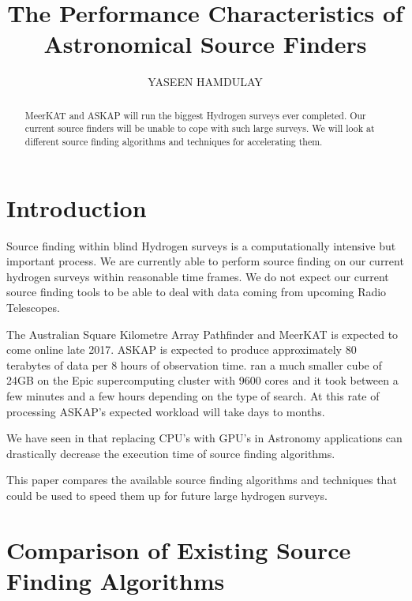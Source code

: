 \documentclass[prodmode,acmtecs]{acmsmall} \usepackage[ruled]{algorithm2e}
\begin{document}
\title{The Performance Characteristics of Astronomical Source Finders}
\author{YASEEN HAMDULAY
}

\begin{abstract}
MeerKAT and ASKAP will run the biggest Hydrogen surveys ever completed. Our current source
finders will be unable to cope with such large surveys. We will look at different source
finding algorithms and techniques for accelerating them.
\end{abstract}


\maketitle

\section{Introduction}
Source finding within blind Hydrogen surveys is a computationally intensive but important process.
We are currently able to perform source finding on our current hydrogen surveys within reasonable
time frames. We do not expect our current source finding tools to be able to deal with data coming from
upcoming Radio Telescopes. 

The Australian Square Kilometre Array Pathfinder and MeerKAT is expected to come online
late 2017. ASKAP is expected to produce approximately 80 terabytes of data per 8 hours of 
observation time. \cite{whiting2012source} ran a much smaller cube of 24GB on the Epic supercomputing
cluster with 9600 cores and it took between a few minutes and a few hours depending on the
type of search. At this rate of processing ASKAP's expected workload will take days to months. 

We have seen in \cite{fluke2011astrophysical} that replacing CPU's with GPU's in Astronomy applications
can drastically decrease the execution time of source finding algorithms.

This paper compares the available source finding algorithms and techniques that could be used to speed
them up for future large hydrogen surveys. 
\cite{holwerda2010trumpeting}
\cite{whiting2012source}
\cite{floer2014source}

\section{Comparison of Existing Source Finding Algorithms}
\end{document}
